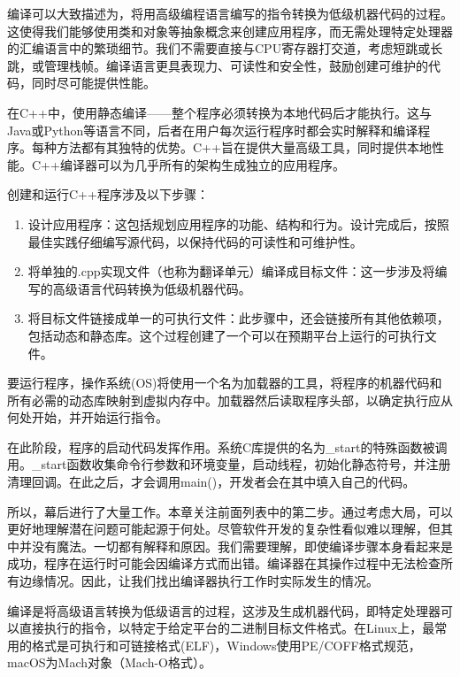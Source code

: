 
编译可以大致描述为，将用高级编程语言编写的指令转换为低级机器代码的过程。这使得我们能够使用类和对象等抽象概念来创建应用程序，而无需处理特定处理器的汇编语言中的繁琐细节。我们不需要直接与CPU寄存器打交道，考虑短跳或长跳，或管理栈帧。编译语言更具表现力、可读性和安全性，鼓励创建可维护的代码，同时尽可能提供性能。

在C++中，使用静态编译——整个程序必须转换为本地代码后才能执行。这与Java或Python等语言不同，后者在用户每次运行程序时都会实时解释和编译程序。每种方法都有其独特的优势。C++旨在提供大量高级工具，同时提供本地性能。C++编译器可以为几乎所有的架构生成独立的应用程序。

创建和运行C++程序涉及以下步骤：

\begin{enumerate}
\item
设计应用程序：这包括规划应用程序的功能、结构和行为。设计完成后，按照最佳实践仔细编写源代码，以保持代码的可读性和可维护性。

\item
将单独的.cpp实现文件（也称为翻译单元）编译成目标文件：这一步涉及将编写的高级语言代码转换为低级机器代码。

\item
将目标文件链接成单一的可执行文件：此步骤中，还会链接所有其他依赖项，包括动态和静态库。这个过程创建了一个可以在预期平台上运行的可执行文件。
\end{enumerate}

要运行程序，操作系统(OS)将使用一个名为加载器的工具，将程序的机器代码和所有必需的动态库映射到虚拟内存中。加载器然后读取程序头部，以确定执行应从何处开始，并开始运行指令。

在此阶段，程序的启动代码发挥作用。系统C库提供的名为\_start的特殊函数被调用。\_start函数收集命令行参数和环境变量，启动线程，初始化静态符号，并注册清理回调。在此之后，才会调用main()，开发者会在其中填入自己的代码。

所以，幕后进行了大量工作。本章关注前面列表中的第二步。通过考虑大局，可以更好地理解潜在问题可能起源于何处。尽管软件开发的复杂性看似难以理解，但其中并没有魔法。一切都有解释和原因。我们需要理解，即使编译步骤本身看起来是成功，程序在运行时可能会因编译方式而出错。编译器在其操作过程中无法检查所有边缘情况。因此，让我们找出编译器执行工作时实际发生的情况。


编译是将高级语言转换为低级语言的过程，这涉及生成机器代码，即特定处理器可以直接执行的指令，以特定于给定平台的二进制目标文件格式。在Linux上，最常用的格式是可执行和可链接格式(ELF)，Windows使用PE/COFF格式规范，macOS为Mach对象（Mach-O格式）。

